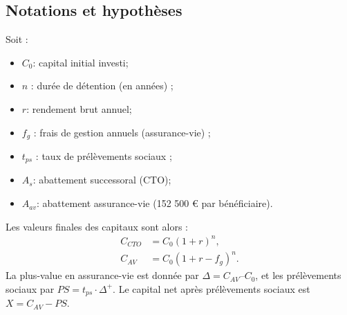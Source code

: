 \subsection{Notations et hypothèses}
\label{sec:notations}

Soit :
\begin{itemize}
    \item \(C_0\): capital initial investi;
    \item \(n\) : durée de détention (en années) ;
    \item \(r\): rendement brut annuel;
    \item \(f_g\) : frais de gestion annuels (assurance-vie) ;
    \item \(t_{ps}\) : taux de prélèvements sociaux ;
    \item \(A_s\): abattement successoral (CTO);
    \item \(A_{av}\): abattement assurance-vie (152 500 € par bénéficiaire).
\end{itemize}
Les valeurs finales des capitaux sont alors :
\begin{align}
    C_{CTO} &= C_0(1 + r)^n, \\
    C_{AV} &= C_0(1 + r - f_g)^n.
\end{align}
La plus-value en assurance-vie est donnée par \(\Delta = C_{AV} – C_0\), et les prélèvements sociaux par \(PS = t_{ps} \cdot \Delta^+\). Le capital net après prélèvements sociaux est \(X = C_{AV} - PS\).
